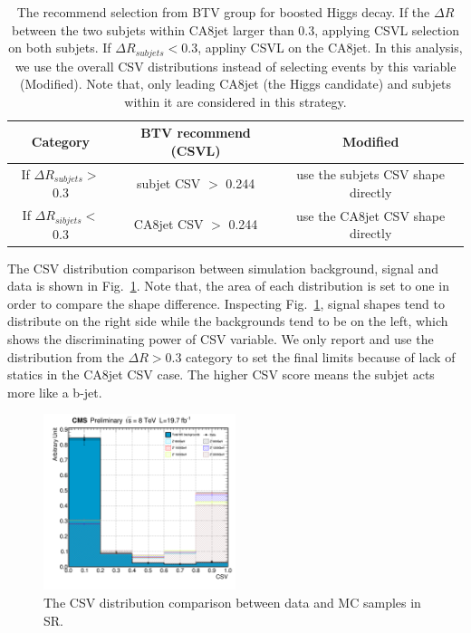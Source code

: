 \begin{center}
  \begin{table}[h]
    \begin{center}
      \begin{tabular}{|c|c|c|}
        \hline
        \textbf{Category} & \textbf{BTV recommend (CSVL)} & \textbf{Modified} \\ \hline
        If $\Delta R_{subjets} > $ 0.3 & subjet CSV $>$ 0.244 & use the subjets CSV shape directly\\
        If $\Delta R_{sibjets} < $ 0.3 & CA8jet CSV $>$ 0.244 & use the CA8jet CSV shape directly\\
        \hline
      \end{tabular}
    \end{center}
    \caption{\label{tab:CSVsel}The recommend selection from BTV group for boosted Higgs decay. If the $\Delta R$ between the two subjets within CA8jet larger than 0.3, applying CSVL selection on both subjets. If $\Delta R_{subjets} < 0.3$, appliny CSVL on the CA8jet. In this analysis, we use the overall CSV distributions instead of selecting events by this variable (Modified). Note that, only leading CA8jet (the Higgs candidate) and subjets within it are considered in this strategy.}
  \end{table}
\end{center}

The CSV distribution comparison between simulation background, signal and data is shown in Fig.~\ref{fig:h_sigCSV}. Note that, the area of each distribution is set to one in order to compare the shape difference. Inspecting Fig.~\ref{fig:h_sigCSV}, signal shapes tend to distribute on the right side while the backgrounds tend to be on the left, which shows the discriminating power of CSV variable. We only report and use the distribution from the $\Delta R > 0.3$ category to set the final limits because of lack of statics in the CA8jet CSV case. The higher CSV score means the subjet acts more like a b-jet.

\begin{figure}[hbtp]
  \begin{center}
    \includegraphics[width=0.5\textwidth]{figure/CH3/h_sigCSV.png}
  \end{center}
  \caption{\label{fig:h_sigCSV}The CSV distribution comparison between data and MC samples in SR.}
\end{figure}

